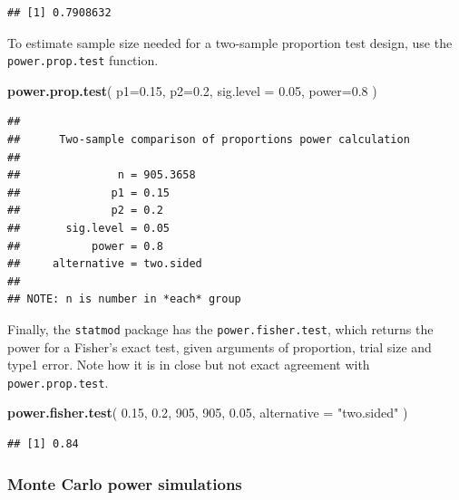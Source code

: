 \documentclass[]{book}
\newenvironment{Shaded}{\begin{snugshade}}{\end{snugshade}}
\newcommand{\DataTypeTok}[1]{\textcolor[rgb]{0.13,0.29,0.53}{#1}}
\newcommand{\DecValTok}[1]{\textcolor[rgb]{0.00,0.00,0.81}{#1}}
\newcommand{\FloatTok}[1]{\textcolor[rgb]{0.00,0.00,0.81}{#1}}
\newcommand{\KeywordTok}[1]{\textcolor[rgb]{0.13,0.29,0.53}{\textbf{#1}}}
\newcommand{\NormalTok}[1]{#1}
\newcommand{\StringTok}[1]{\textcolor[rgb]{0.31,0.60,0.02}{#1}}
\begin{document}
\begin{verbatim}
## [1] 0.7908632
\end{verbatim}

To estimate sample size needed for a two-sample proportion test design, use the \texttt{power.prop.test} function.

\begin{Shaded}
\begin{Highlighting}[]
\KeywordTok{power.prop.test}\NormalTok{(}
  \DataTypeTok{p1=}\FloatTok{0.15}\NormalTok{, }
  \DataTypeTok{p2=}\FloatTok{0.2}\NormalTok{, }
  \DataTypeTok{sig.level =} \FloatTok{0.05}\NormalTok{, }
  \DataTypeTok{power=}\FloatTok{0.8}
\NormalTok{  )}
\end{Highlighting}
\end{Shaded}

\begin{verbatim}
## 
##      Two-sample comparison of proportions power calculation 
## 
##               n = 905.3658
##              p1 = 0.15
##              p2 = 0.2
##       sig.level = 0.05
##           power = 0.8
##     alternative = two.sided
## 
## NOTE: n is number in *each* group
\end{verbatim}

Finally, the \texttt{statmod} package has the \texttt{power.fisher.test}, which returns the power for a Fisher's exact test, given arguments of proportion, trial size and type1 error. Note how it is in close but not exact agreement with \texttt{power.prop.test}.

\begin{Shaded}
\begin{Highlighting}[]
\KeywordTok{power.fisher.test}\NormalTok{(}
  \FloatTok{0.15}\NormalTok{, }\FloatTok{0.2}\NormalTok{, }\DecValTok{905}\NormalTok{, }\DecValTok{905}\NormalTok{, }\FloatTok{0.05}\NormalTok{, }
  \DataTypeTok{alternative =} \StringTok{"two.sided"}
\NormalTok{  )}
\end{Highlighting}
\end{Shaded}

\begin{verbatim}
## [1] 0.84
\end{verbatim}

\hypertarget{monte-carlo-power-simulations}{%
\subsubsection{Monte Carlo power simulations}\label{monte-carlo-power-simulations}}
\end{document}
